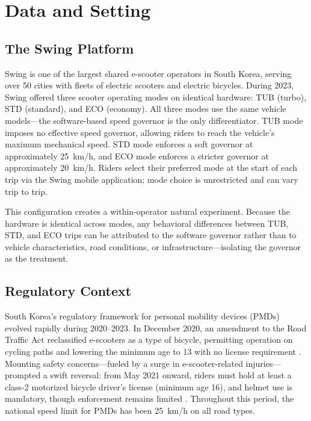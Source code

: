 \section{Data and Setting}
\label{sec:data}

\subsection{The Swing Platform}
\label{sec:data_platform}

Swing is one of the largest shared e-scooter operators in South Korea, serving over 50 cities with fleets of electric scooters and electric bicycles. During 2023, Swing offered three scooter operating modes on identical hardware: TUB (turbo), STD (standard), and ECO (economy). All three modes use the same vehicle models---the software-based speed governor is the only differentiator. TUB mode imposes no effective speed governor, allowing riders to reach the vehicle's maximum mechanical speed. STD mode enforces a soft governor at approximately 25~km/h, and ECO mode enforces a stricter governor at approximately 20~km/h. Riders select their preferred mode at the start of each trip via the Swing mobile application; mode choice is unrestricted and can vary trip to trip.

This configuration creates a within-operator natural experiment. Because the hardware is identical across modes, any behavioral differences between TUB, STD, and ECO trips can be attributed to the software governor rather than to vehicle characteristics, road conditions, or infrastructure---isolating the governor as the treatment.

\subsection{Regulatory Context}
\label{sec:data_regulation}

South Korea's regulatory framework for personal mobility devices (PMDs) evolved rapidly during 2020--2023. In December 2020, an amendment to the Road Traffic Act reclassified e-scooters as a type of bicycle, permitting operation on cycling paths and lowering the minimum age to 13 with no license requirement \citep{koreaherald2020escooter}. Mounting safety concerns---fueled by a surge in e-scooter-related injuries---prompted a swift reversal: from May 2021 onward, riders must hold at least a class-2 motorized bicycle driver's license (minimum age 16), and helmet use is mandatory, though enforcement remains limited \citep{koreaherald2021license}. Throughout this period, the national speed limit for PMDs has been 25~km/h on all road types.

